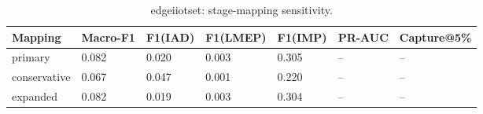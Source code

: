 \begin{table}[t]
\centering
\caption{edgeiiotset: stage-mapping sensitivity.}
\label{tab:edgeiiotset_stage_mapping_sensitivity}
\begin{tabular}{lllllll}
\toprule
Mapping & Macro-F1 & F1(IAD) & F1(LMEP) & F1(IMP) & PR-AUC & Capture@5\% \\
\midrule
primary & 0.082 & 0.020 & 0.003 & 0.305 & -- & -- \\
conservative & 0.067 & 0.047 & 0.001 & 0.220 & -- & -- \\
expanded & 0.082 & 0.019 & 0.003 & 0.304 & -- & -- \\
\bottomrule
\end{tabular}
\end{table}
